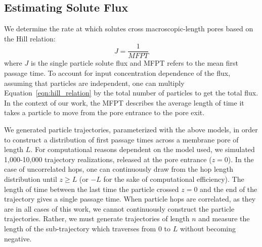 \documentclass[aps,pre,preprint,groupedaddress]{revtex4-2}
\begin{document}

  \subsection{Estimating Solute Flux}\label{method:mfpt}
  
  We determine the rate at which solutes cross macroscopic-length pores based on the
  Hill relation:~\cite{hill_free_1989}
  \begin{equation}
  J = \frac{1}{MFPT}
  \label{eqn:hill_relation}
  \end{equation}
  where $J$ is the single particle solute flux and MFPT refers to the mean first passage
  time. To account for input concentration dependence of the flux, assuming that particles
  are independent, one can multiply Equation~\ref{eqn:hill_relation} by the total number
  of particles to get the total flux. In the context of our work, the MFPT describes the
  average length of time it takes a particle to move from the pore entrance to the pore exit. 
  
  We generated particle trajectories, parameterized with the above models, in order
  to construct a distribution of first passage times across a membrane pore of length $L$.
  For computational 
  reasons dependent on the model used, we simulated 1,000-10,000 trajectory
  realizations, released at the pore entrance ($z=0$). In the case of 
  uncorrelated hops, one can continuously draw from the hop length distribution until 
  $z \geq L$ (or $-L$ for the sake of computational efficiency). The length of time 
  between the last time the particle crossed $z=0$ and the end of the trajectory gives a 
  single passage time. When particle hops are correlated, as they are in all cases of
  this work, we cannot continuously construct the particle trajectories. Rather, we must
  generate trajectories of length $n$ and measure the length of the sub-trajectory 
  which traverses from $0$ to $L$ without becoming negative.
  
\end{document}
